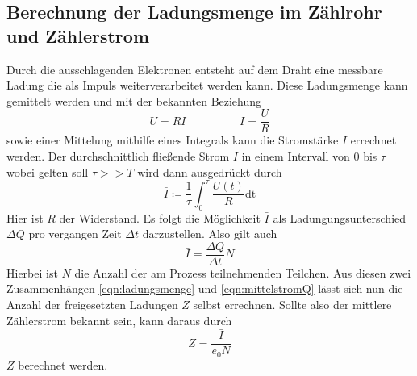 \subsection{Berechnung der Ladungsmenge im Zählrohr und Zählerstrom}
Durch die ausschlagenden Elektronen entsteht auf dem Draht eine messbare Ladung die als Impuls weiterverarbeitet werden kann.
Diese Ladungsmenge kann gemittelt werden und mit der bekannten Beziehung
\begin{equation*}
U=RI \hspace{2cm} I=\frac{U}{R}
\end{equation*}
sowie einer Mittelung mithilfe eines Integrals kann die Stromstärke $I$ errechnet werden.
Der durchschnittlich fließende Strom $I$ in einem Intervall von $0$ bis $\tau$ wobei gelten soll $\tau>>T$ wird dann ausgedrückt durch
\begin{equation}
\label{eqn:ladungsmenge}
\bar{\si{I}} \coloneqq \frac{1}{\tau} \int_{0}^{\tau} \frac{U(t)}{R} \text{dt}
\end{equation}
Hier ist $R$ der Widerstand. 
Es folgt die Möglichkeit $\bar{\si{I}}$ als Ladungungsunterschied $\Delta \si{Q}$ pro vergangen Zeit $\Delta \si{t}$ darzustellen. 
Also gilt auch
\begin{equation}
\label{eqn:mittelstromQ}
\bar{\si{I}} = \frac{\Delta \si{Q}}{\Delta\si{t}}\si{N}
\end{equation}  
Hierbei ist $\si{N}$ die Anzahl der am Prozess teilnehmenden Teilchen.
Aus diesen zwei Zusammenhängen \eqref{eqn:ladungsmenge} und \eqref{eqn:mittelstromQ} lässt sich nun die Anzahl der freigesetzten Ladungen $\si{Z}$
selbst errechnen. Sollte also der mittlere Zählerstrom bekannt sein, kann daraus durch 
\begin{equation}
\label{eqn:teilchen}
\si{Z} = \frac{\bar{\si{I}}}{e_0N}
\end{equation}
$\si{Z}$ berechnet werden.

